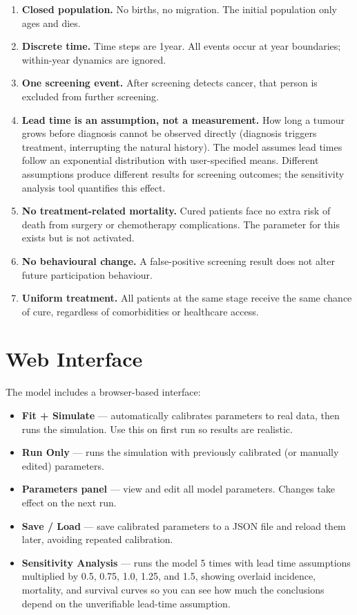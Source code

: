 \documentclass[12pt,a4paper]{article}
\begin{document}
\begin{enumerate}
    \item \textbf{Closed population.} No births, no migration. The initial population only ages and dies.

    \item \textbf{Discrete time.} Time steps are 1\;year. All events occur at year boundaries; within-year dynamics are ignored.

    \item \textbf{One screening event.} After screening detects cancer, that person is excluded from further screening.

    \item \textbf{Lead time is an assumption, not a measurement.} How long a tumour grows before diagnosis cannot be observed directly (diagnosis triggers treatment, interrupting the natural history). The model assumes lead times follow an exponential distribution with user-specified means. Different assumptions produce different results for screening outcomes; the sensitivity analysis tool quantifies this effect.

    \item \textbf{No treatment-related mortality.} Cured patients face no extra risk of death from surgery or chemotherapy complications. The parameter for this exists but is not activated.

    \item \textbf{No behavioural change.} A false-positive screening result does not alter future participation behaviour.

    \item \textbf{Uniform treatment.} All patients at the same stage receive the same chance of cure, regardless of comorbidities or healthcare access.
\end{enumerate}

\section{Web Interface}

The model includes a browser-based interface:

\begin{itemize}[nosep]
    \item \textbf{Fit + Simulate} --- automatically calibrates parameters to real data, then runs the simulation. Use this on first run so results are realistic.
    \item \textbf{Run Only} --- runs the simulation with previously calibrated (or manually edited) parameters.
    \item \textbf{Parameters panel} --- view and edit all model parameters. Changes take effect on the next run.
    \item \textbf{Save / Load} --- save calibrated parameters to a JSON file and reload them later, avoiding repeated calibration.
    \item \textbf{Sensitivity Analysis} --- runs the model 5 times with lead time assumptions multiplied by 0.5, 0.75, 1.0, 1.25, and 1.5, showing overlaid incidence, mortality, and survival curves so you can see how much the conclusions depend on the unverifiable lead-time assumption.
\end{itemize}
\end{document}
